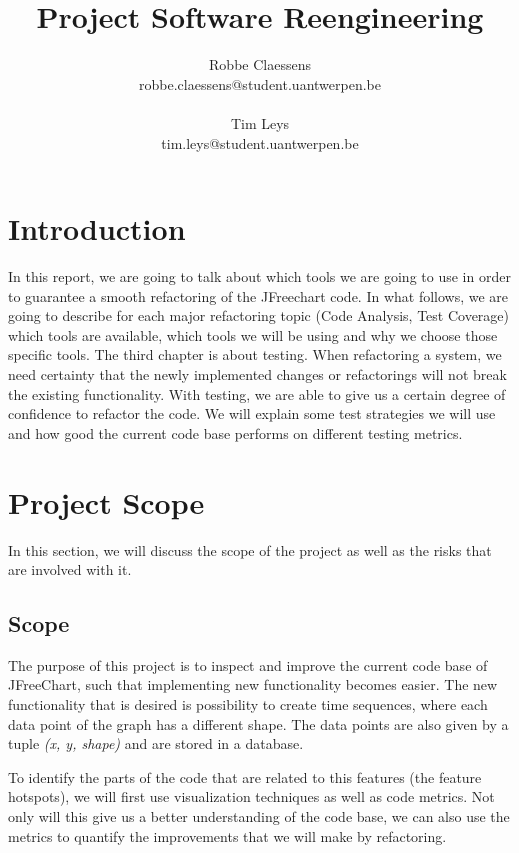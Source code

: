 \documentclass[]{article}
\title{Project Software Reengineering}
\author{Robbe Claessens \\ robbe.claessens@student.uantwerpen.be \\ \\Tim Leys\\tim.leys@student.uantwerpen.be}
\begin{document}
\maketitle



\section{Introduction}
In this report, we are going to talk about which tools we are going to use in order to guarantee a smooth refactoring of the JFreechart code. In what follows, we are going to describe for each major refactoring topic (Code Analysis, Test Coverage) which tools are available, which tools we will be using and why we choose those specific tools. The third chapter is about testing. When refactoring a system, we need certainty that the newly implemented changes or refactorings will not break the existing functionality. With testing, we are able to give us a certain degree of confidence to refactor the code. We will explain some test strategies we will use and how good the current code base performs on different testing metrics.

\section{Project Scope}

In this section, we will discuss the scope of the project as well as the risks that are involved with it.

\subsection{Scope}
The purpose of this project is to inspect and improve the current code base of JFreeChart, such that implementing new functionality becomes easier. The new functionality that is desired is possibility to create time sequences, where each data point of the graph has a different shape. The data points are also given by a tuple \textit{(x, y, shape)} and are stored in a database. 

To identify the parts of the code that are related to this features (the feature hotspots), we will first use visualization techniques as well as code metrics. Not only will this give us a better understanding of the code base, we can also use the metrics to quantify the improvements that we will make by refactoring.
\end{document}
